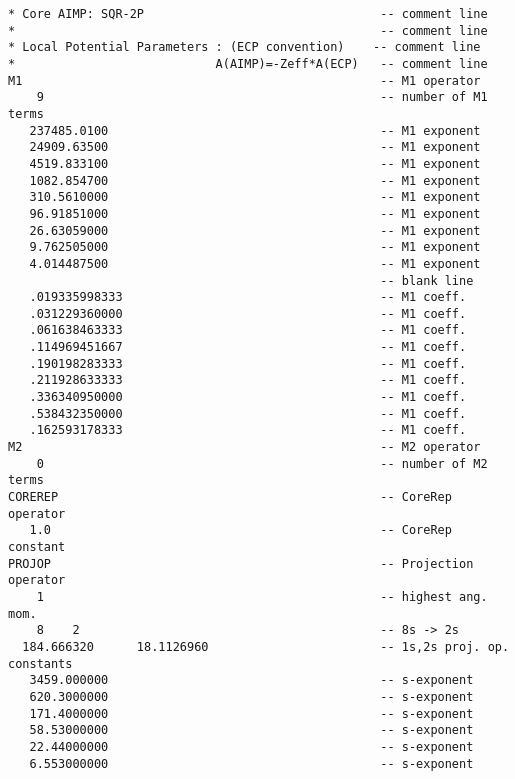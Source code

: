{\begin{verbatim}
* Core AIMP: SQR-2P                                 -- comment line
*                                                   -- comment line
* Local Potential Parameters : (ECP convention)    -- comment line
*                            A(AIMP)=-Zeff*A(ECP)   -- comment line
M1                                                  -- M1 operator
    9                                               -- number of M1 terms
   237485.0100                                      -- M1 exponent
   24909.63500                                      -- M1 exponent
   4519.833100                                      -- M1 exponent
   1082.854700                                      -- M1 exponent
   310.5610000                                      -- M1 exponent
   96.91851000                                      -- M1 exponent
   26.63059000                                      -- M1 exponent
   9.762505000                                      -- M1 exponent
   4.014487500                                      -- M1 exponent
                                                    -- blank line
   .019335998333                                    -- M1 coeff.
   .031229360000                                    -- M1 coeff.
   .061638463333                                    -- M1 coeff.
   .114969451667                                    -- M1 coeff.
   .190198283333                                    -- M1 coeff.
   .211928633333                                    -- M1 coeff.
   .336340950000                                    -- M1 coeff.
   .538432350000                                    -- M1 coeff.
   .162593178333                                    -- M1 coeff.
M2                                                  -- M2 operator
    0                                               -- number of M2 terms
COREREP                                             -- CoreRep operator
   1.0                                              -- CoreRep constant
PROJOP                                              -- Projection operator
    1                                               -- highest ang. mom.
    8    2                                          -- 8s -> 2s
  184.666320      18.1126960                        -- 1s,2s proj. op. constants
   3459.000000                                      -- s-exponent
   620.3000000                                      -- s-exponent
   171.4000000                                      -- s-exponent
   58.53000000                                      -- s-exponent
   22.44000000                                      -- s-exponent
   6.553000000                                      -- s-exponent

\end{verbatim}}
